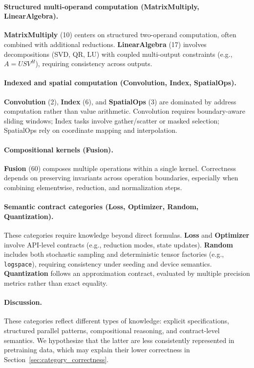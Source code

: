 \paragraph{Structured multi-operand computation (MatrixMultiply, LinearAlgebra).}
\textbf{MatrixMultiply} (10) centers on structured two-operand computation, often combined with additional reductions. \textbf{LinearAlgebra} (17) involves decompositions (SVD, QR, LU) with coupled multi-output constraints (e.g., $A = U S V^H$), requiring consistency across outputs.

\paragraph{Indexed and spatial computation (Convolution, Index, SpatialOps).}
\textbf{Convolution} (2), \textbf{Index} (6), and \textbf{SpatialOps} (3) are dominated by address computation rather than value arithmetic. Convolution requires boundary-aware sliding windows; Index tasks involve gather/scatter or masked selection; SpatialOps rely on coordinate mapping and interpolation.

\paragraph{Compositional kernels (Fusion).}
\textbf{Fusion} (60) composes multiple operations within a single kernel. Correctness depends on preserving invariants across operation boundaries, especially when combining elementwise, reduction, and normalization steps.

\paragraph{Semantic contract categories (Loss, Optimizer, Random, Quantization).}
These categories require knowledge beyond direct formulas. \textbf{Loss} and \textbf{Optimizer} involve API-level contracts (e.g., reduction modes, state updates). \textbf{Random} includes both stochastic sampling and deterministic tensor factories (e.g., \texttt{logspace}), requiring consistency under seeding and device semantics. \textbf{Quantization} follows an approximation contract, evaluated by multiple precision metrics rather than exact equality.

\paragraph{Discussion.}
These categories reflect different types of knowledge: explicit specifications, structured parallel patterns, compositional reasoning, and contract-level semantics. 
We hypothesize that the latter are less consistently represented in pretraining data, which may explain their lower correctness in Section~\ref{sec:category_correctness}.

